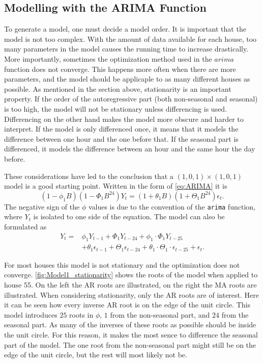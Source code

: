 \subsection{Modelling with the ARIMA Function}
To generate a model, one must decide a model order. It is important that the model is not too complex. With the amount of data available for each house, too many parameters in the model causes the running time to increase drastically. More importantly, sometimes the optimization method used in the $arima$ function does not converge. This happens more often when there are more parameters, and the model should be applicaple to as many different houses as possible. As mentioned in the section above, stationarity is an important property. If the order of the autoregressive part (both non-seasonal and seasonal) is too high, the model will not be stationary unless differencing is used. Differencing on the other hand makes the model more obscure and harder to interpret. If the model is only differenced once, it means that it models the difference between one hour and the one before that. If the seasonal part is differenced, it models the difference between an hour and the same hour the day before.

\noindent These considerations have led to the conclusion that a $(1,0,1)\times (1,0,1)$ model is a good starting point. Written in the form of \cref{eq:ARIMA} it is
\begin{equation}
    (1-\phi_1 B)(1-\Phi_1 B^{24})Y_t = (1+\theta_1 B)(1+\Theta_1 B^{24}) \epsilon_t. \label{eq:model1}
\end{equation}
The negative sign of the $\phi$ values is due to the convention of the \texttt{arima} function, where $Y_t$ is isolated to one side of the equation. The model can also be formulated as
\begin{align}
    Y_t = &\phi_1 Y_{t-1} + \Phi_1 Y_{t-24} + \phi_1 \cdot \Phi_1  Y_{t-25}\\  &+ \theta_1 \epsilon_{t-1} + \Theta_1 \epsilon_{t-24} + \theta_1 \cdot \Theta_1 \cdot \epsilon_{t-25} + \epsilon_t. \nonumber
\end{align}

\noindent For most houses this model is not stationary and the optimization does not converge. \cref{fig:Model1_stationarity} shows the roots of the model when applied to house 55. On the left the AR roots are illustrated, on the right the MA roots are illustrated. When considering stationarity, only the AR roots are of interest. Here it can be seen how every inverse AR root is on the edge of the unit circle. This model introduces $25$ roots in $\phi$, $1$ from the non-seasonal part, and $24$ from the seasonal part. As many of the inverses of these roots as possible should be inside the unit circle. For this reason, it makes the most sence to difference the seasonal part of the model. The one root from the non-seasonal part might still be on the edge of the unit circle, but the rest will most likely not be.


